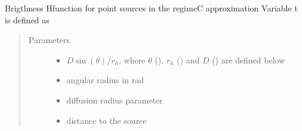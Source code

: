 \documentclass[letterpaper,10pt,english]{sphinxmanual}
\begin{document}
\begin{fulllineitems}
\label{\detokenize{diffsph.profiles:diffsph.profiles.analytics.psbrC}}
\sphinxAtStartPar
Brigthness H\sphinxhyphen{}function for point sources in the regime\sphinxhyphen{}C approximation
Variable t is defined as
\begin{quote}\begin{description}
\item[{Parameters}] \leavevmode\begin{itemize}
\item {} 
\sphinxAtStartPar
{} \textendash{} \(D\sin(\theta)/r_h\), where \(\theta\) (), \(r_h\) () and \(D\) () are defined below

\item {} 
\sphinxAtStartPar
{} \textendash{} angular radius in rad

\item {} 
\sphinxAtStartPar
{} \textendash{} diffusion radius parameter

\item {} 
\sphinxAtStartPar
{} \textendash{} distance to the source

\end{itemize}

\end{description}\end{quote}

\end{fulllineitems}

\end{document}
